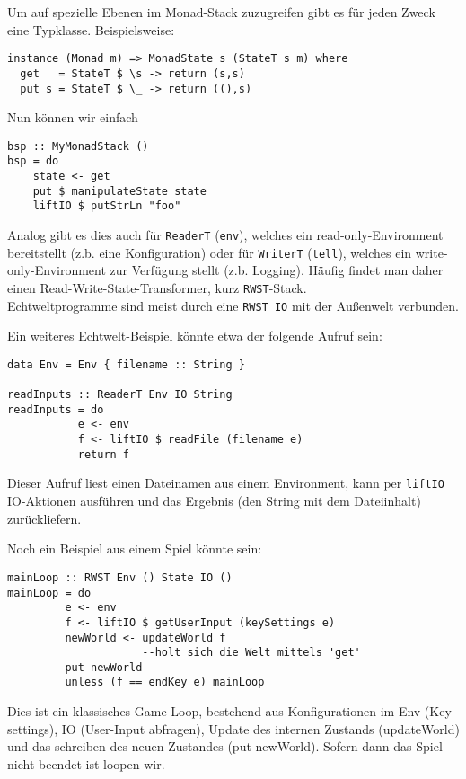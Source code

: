 \documentclass{beamer}
\begin{document}
\begin{frame}[fragile]
Um auf spezielle Ebenen im Monad-Stack zuzugreifen gibt es für jeden Zweck eine Typklasse. Beispielsweise:
\pause
\begin{verbatim}
instance (Monad m) => MonadState s (StateT s m) where
  get   = StateT $ \s -> return (s,s)
  put s = StateT $ \_ -> return ((),s)
\end{verbatim}
\pause
Nun können wir einfach
\begin{verbatim}
bsp :: MyMonadStack ()
bsp = do
    state <- get
    put $ manipulateState state
    liftIO $ putStrLn "foo"
\end{verbatim}
\pause
Analog gibt es dies auch für \texttt{ReaderT} (\texttt{env}), welches ein read-only-Environment bereitstellt (z.b. eine Konfiguration) oder für \texttt{WriterT} (\texttt{tell}), welches ein write-only-Environment zur Verfügung stellt (z.b. Logging). Häufig findet man daher einen Read-Write-State-Transformer, kurz \texttt{RWST}-Stack.\\
\pause
Echtweltprogramme sind meist durch eine \texttt{RWST IO} mit der Außenwelt verbunden.
\end{frame}

\begin{frame}[fragile]
Ein weiteres Echtwelt-Beispiel könnte etwa der folgende Aufruf sein:
\begin{verbatim}
data Env = Env { filename :: String }

readInputs :: ReaderT Env IO String
readInputs = do
           e <- env
           f <- liftIO $ readFile (filename e)
           return f
\end{verbatim}
\pause
Dieser Aufruf liest einen Dateinamen aus einem Environment, kann per \texttt{liftIO} IO-Aktionen ausführen und das Ergebnis (den String mit dem Dateiinhalt) zurückliefern.
\end{frame}

\begin{frame}[fragile]
Noch ein Beispiel aus einem Spiel könnte sein:
\begin{verbatim}
mainLoop :: RWST Env () State IO ()
mainLoop = do
         e <- env
         f <- liftIO $ getUserInput (keySettings e)
         newWorld <- updateWorld f 
                     --holt sich die Welt mittels 'get'
         put newWorld
         unless (f == endKey e) mainLoop
\end{verbatim}
\pause
Dies ist ein klassisches Game-Loop, bestehend aus Konfigurationen im Env (Key settings), IO (User-Input abfragen), Update des internen Zustands (updateWorld) und das schreiben des neuen Zustandes (put newWorld). Sofern dann das Spiel nicht beendet ist loopen wir.
\end{frame}
\end{document}
